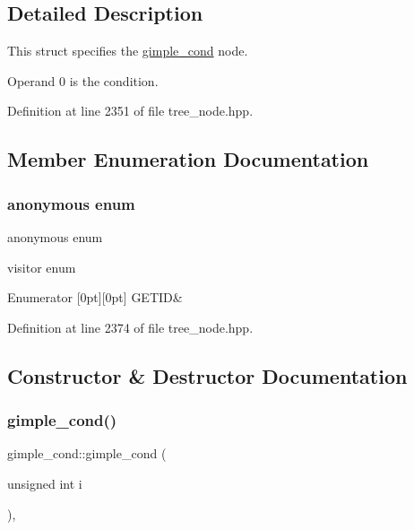 \subsection{Detailed Description}
This struct specifies the \hyperlink{structgimple__cond}{gimple\+\_\+cond} node. 

Operand 0 is the condition. 

Definition at line 2351 of file tree\+\_\+node.\+hpp.



\subsection{Member Enumeration Documentation}
\mbox{\label{structgimple__cond_a9b7ef000d824653671c72fecd2ecaa10}} 
\subsubsection{\texorpdfstring{anonymous enum}{anonymous enum}}
{\footnotesize\ttfamily anonymous enum}



visitor enum 

\begin{DoxyEnumFields}{Enumerator}
[0pt][0pt]{}\mbox{\label{structgimple__cond_a9b7ef000d824653671c72fecd2ecaa10a81861a918db37204ce346f026a0a7e99}} 
G\+E\+T\+ID&\\
\hline

\end{DoxyEnumFields}


Definition at line 2374 of file tree\+\_\+node.\+hpp.



\subsection{Constructor \& Destructor Documentation}
\mbox{\label{structgimple__cond_aa3141fe9a7adbb64be5d617575645124}} 
\subsubsection{\texorpdfstring{gimple\+\_\+cond()}{gimple\_cond()}}
{\footnotesize\ttfamily gimple\+\_\+cond\+::gimple\+\_\+cond (\begin{DoxyParamCaption}\item[{unsigned int}]{i }\end{DoxyParamCaption})\hspace{0.3cm}{\ttfamily [inline]}, {\ttfamily [explicit]}}



